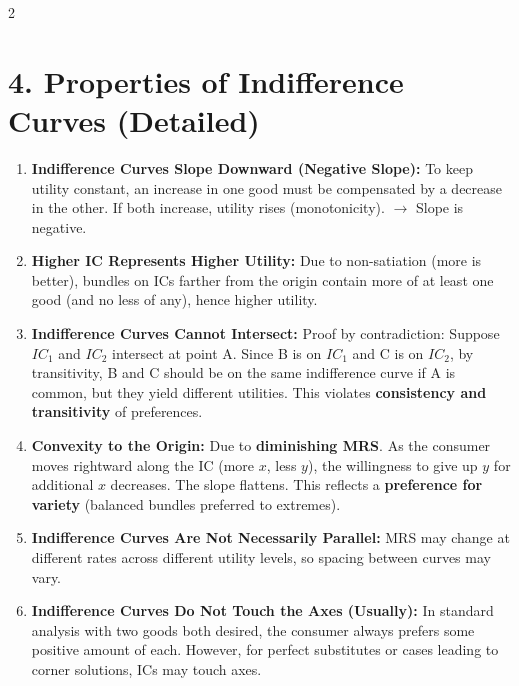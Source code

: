 \documentclass[10pt,a4paper]{article}
\begin{document}
\begin{multicols}{2}
\section*{4. Properties of Indifference Curves (Detailed)}

\begin{enumerate}[leftmargin=*,nosep]
    \item \textbf{Indifference Curves Slope Downward (Negative Slope):} To keep utility constant, an increase in one good must be compensated by a decrease in the other. If both increase, utility rises (monotonicity). $\to$ Slope is negative.
    \item \textbf{Higher IC Represents Higher Utility:} Due to non-satiation (more is better), bundles on ICs farther from the origin contain more of at least one good (and no less of any), hence higher utility.
    \item \textbf{Indifference Curves Cannot Intersect:} Proof by contradiction: Suppose $IC_1$ and $IC_2$ intersect at point A. Since B is on $IC_1$ and C is on $IC_2$, by transitivity, B and C should be on the same indifference curve if A is common, but they yield different utilities. This violates \textbf{consistency and transitivity} of preferences.
    \item \textbf{Convexity to the Origin:} Due to \textbf{diminishing MRS}. As the consumer moves rightward along the IC (more $x$, less $y$), the willingness to give up $y$ for additional $x$ decreases. The slope flattens. This reflects a \textbf{preference for variety} (balanced bundles preferred to extremes).
    \item \textbf{Indifference Curves Are Not Necessarily Parallel:} MRS may change at different rates across different utility levels, so spacing between curves may vary.
    \item \textbf{Indifference Curves Do Not Touch the Axes (Usually):} In standard analysis with two goods both desired, the consumer always prefers some positive amount of each. However, for perfect substitutes or cases leading to corner solutions, ICs may touch axes.
\end{enumerate}


\end{multicols}
\end{document}
